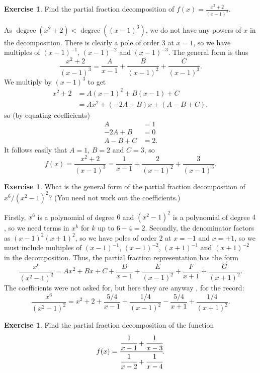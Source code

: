 \documentclass[a4paper]{book}
\newcommand{\degree}    {\operatorname{degree}}
\renewcommand{\:}{\colon}
\theoremstyle{definition}
\newtheorem{exercise}[theorem]{Exercise}
\renewenvironment{solution}{\SolutionInline}{\endSolutionInline}
\begin{document}
\begin{exercise}
 Find the partial fraction decomposition of
 $f(x)=\frac{x^2+2}{(x-1)^3}$.
\end{exercise}
\begin{solution}
 As $\degree(x^2+2)<\degree((x-1)^3)$, we do not have any powers of
 $x$ in the decomposition.  There is clearly a pole of order $3$ at
 $x=1$, so we have multiples of $(x-1)^{-1}$, $(x-1)^{-2}$ and
 $(x-1)^{-3}$.  The general form is thus
 \[ \frac{x^2+2}{(x-1)^3} =
     \frac{A}{x-1} + \frac{B}{(x-1)^2} + \frac{C}{(x-1)^3}.
 \]
 We multiply by $(x-1)^3$ to get
 \begin{align*}
  x^2 + 2 &= A(x-1)^2 + B(x-1) + C \\
          &= Ax^2 + (-2A+B)x + (A-B+C),
 \end{align*}
 so (by equating coefficients)
 \begin{align*}
  A &= 1 \\
  -2A+B &= 0 \\
  A-B+C &= 2.
 \end{align*}
 It follows easily that $A=1$, $B=2$ and $C=3$, so
 \[ f(x) = \frac{x^2+2}{(x-1)^3} =
     \frac{1}{x-1} + \frac{2}{(x-1)^2} + \frac{3}{(x-1)^3}.
 \]
\end{solution}
\begin{exercise}
 What is the general form of the partial fraction decomposition of
 $x^6/(x^2-1)^2$?  (You need not work out the coefficients.)
\end{exercise}
\begin{solution}
 Firstly, $x^6$ is a polynomial of degree $6$ and $(x^2-1)^2$ is a
 polynomial of degree $4$, so we need terms in $x^k$ for $k$ up to
 $6-4=2$.  Secondly, the denominator factors as $(x-1)^2(x+1)^2$, so
 we have poles of order $2$ at $x=-1$ and $x=+1$, so we must include
 multiples of $(x-1)^{-1}$, $(x-1)^{-2}$, $(x+1)^{-1}$ and
 $(x+1)^{-2}$ in the decomposition.  Thus, the partial fraction
 representation has the form
 \[ \frac{x^6}{(x^2-1)^2} = 
     Ax^2 + Bx + C + \frac{D}{x-1} + \frac{E}{(x-1)^2} 
                   + \frac{F}{x+1} + \frac{G}{(x+1)^2}. 
 \]
 The coefficients were not asked for, but here they are anyway , for
 the record:
 \[ \frac{x^6}{(x^2-1)^2} = 
     x^2  + 2 + \frac{5/4}{x-1} + \frac{1/4}{(x-1)^2} 
              - \frac{5/4}{x+1} + \frac{1/4}{(x+1)^2}. 
 \]
\end{solution}
\begin{exercise}
 Find the partial fraction decomposition of the function
 \[ f(x) = \cfrac{\cfrac{1}{x-1} + \cfrac{1}{x-3}}
                 {\cfrac{1}{x-2} + \cfrac{1}{x-4}}. \]
\end{exercise}
\end{document}
